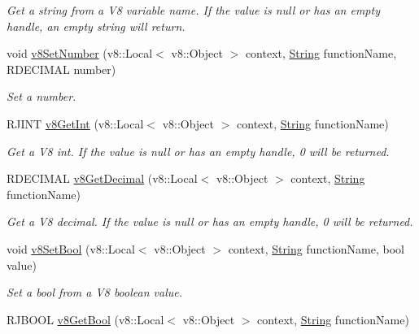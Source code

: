 \begin{DoxyCompactItemize}
\begin{DoxyCompactList}\small\item\em Get a string from a V8 variable name. If the value is null or has an empty handle, an empty string will return. \end{DoxyCompactList}\item 
void \mbox{\hyperlink{class_rad_j_a_v_1_1_v8_javascript_engine_a05a3133ff9eba6aebe30e0678a2d8f41}{v8\+Set\+Number}} (v8\+::\+Local$<$ v8\+::\+Object $>$ context, \mbox{\hyperlink{class_rad_j_a_v_1_1_string}{String}} function\+Name, R\+D\+E\+C\+I\+M\+AL number)
\begin{DoxyCompactList}\small\item\em Set a number. \end{DoxyCompactList}\item 
R\+J\+I\+NT \mbox{\hyperlink{class_rad_j_a_v_1_1_v8_javascript_engine_ae9933ac14e6e4a7ad570d28a9d5d75d2}{v8\+Get\+Int}} (v8\+::\+Local$<$ v8\+::\+Object $>$ context, \mbox{\hyperlink{class_rad_j_a_v_1_1_string}{String}} function\+Name)
\begin{DoxyCompactList}\small\item\em Get a V8 int. If the value is null or has an empty handle, 0 will be returned. \end{DoxyCompactList}\item 
R\+D\+E\+C\+I\+M\+AL \mbox{\hyperlink{class_rad_j_a_v_1_1_v8_javascript_engine_a27221a196a2a0d65c687c013c71cf5c0}{v8\+Get\+Decimal}} (v8\+::\+Local$<$ v8\+::\+Object $>$ context, \mbox{\hyperlink{class_rad_j_a_v_1_1_string}{String}} function\+Name)
\begin{DoxyCompactList}\small\item\em Get a V8 decimal. If the value is null or has an empty handle, 0 will be returned. \end{DoxyCompactList}\item 
void \mbox{\hyperlink{class_rad_j_a_v_1_1_v8_javascript_engine_a063f58908a039df554d99bffd8883cb5}{v8\+Set\+Bool}} (v8\+::\+Local$<$ v8\+::\+Object $>$ context, \mbox{\hyperlink{class_rad_j_a_v_1_1_string}{String}} function\+Name, bool value)
\begin{DoxyCompactList}\small\item\em Set a bool from a V8 boolean value. \end{DoxyCompactList}\item 
R\+J\+B\+O\+OL \mbox{\hyperlink{class_rad_j_a_v_1_1_v8_javascript_engine_a688c6447c659170b028377150859996c}{v8\+Get\+Bool}} (v8\+::\+Local$<$ v8\+::\+Object $>$ context, \mbox{\hyperlink{class_rad_j_a_v_1_1_string}{String}} function\+Name)

\end{DoxyCompactItemize}
